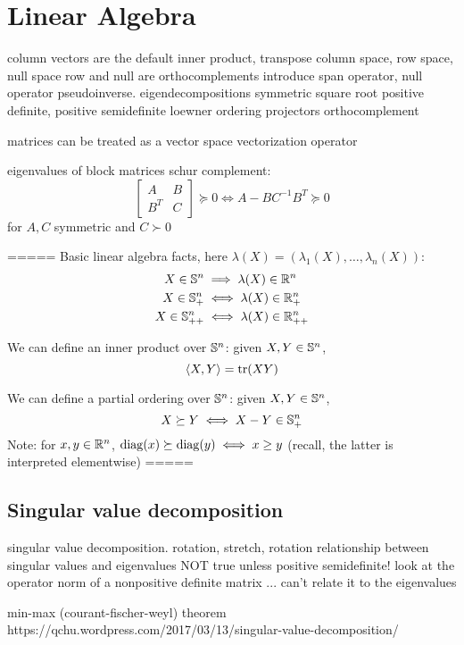 \chapter{Linear Algebra}
\label{chap:linear_algebra}

column vectors are the default
inner product, transpose
column space, row space, null space
row and null are orthocomplements
introduce span operator, null operator
pseudoinverse. %
eigendecompositions
symmetric square root
positive definite, positive semidefinite
loewner ordering %
projectors
orthocomplement

matrices can be treated as a vector space 
vectorization operator

eigenvalues of block matrices
schur complement:
$$
\begin{bmatrix} A & B \\ B^T & C \end{bmatrix} \succeq 0
\iff A - BC^{-1} B^T \succeq 0
$$
for $A,C$ symmetric and $C \succ 0$

=====
Basic linear algebra facts, here
  $\lambda(X)=(\lambda_1(X),\ldots,\lambda_n(X))$: 
\begin{alignat*}{2}
X \in \mathbb{S}^n &\implies \lambda(X)\in \mathbb{R}^n \\
X \in \mathbb{S}^n_+ &\iff \lambda(X)\in \mathbb{R}^n_+ \\
X \in \mathbb{S}^n_{++} &\iff \lambda(X)\in \mathbb{R}^n_{++}
\end{alignat*}

We can define an inner product over $\mathbb{S}^n$: given $X,Y\in \mathbb{S}^n$,
$$
\langle X, Y \rangle = \operatorname{tr}(XY) 
$$

We can define a partial ordering over $\mathbb{S}^n$: 
  given $X,Y\in \mathbb{S}^n$, 
$$
X\succeq Y \iff X-Y \in \mathbb{S}^n_+
$$
Note: for $x,y \in \mathbb{R}^n$, $\operatorname{diag}(x) \succeq \operatorname{diag}(y) \iff x \geq y$
(recall, the latter is interpreted elementwise)
=====

\section{Singular value decomposition}
\label{sec:singular_value_decomposition}

singular value decomposition. rotation, stretch, rotation
relationship between singular values and eigenvalues
NOT true unless positive semidefinite! 
look at the operator norm of a nonpositive definite matrix ... can't relate it to the eigenvalues

min-max (courant-fischer-weyl) theorem
https://qchu.wordpress.com/2017/03/13/singular-value-decomposition/
